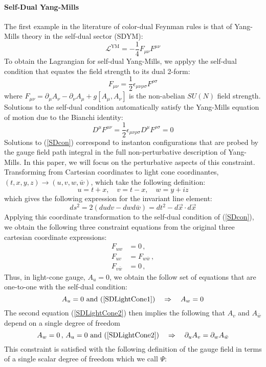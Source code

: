 \documentclass[11pt,letter]{article}
\def\eqn#1{(\ref{#1})}
\def\be{\begin{equation}}
\def\ee{\end{equation}}
\begin{document}
\paragraph{Self-Dual Yang-Mills} The first example in the literature \cite{} of color-dual Feynman rules is that of Yang-Mills theory in the self-dual sector (SDYM):
\be
\mathcal{L}^{\text{YM}} = -\frac{1}{4}F_{\mu\nu}F^{\mu\nu}
\ee
To obtain the Lagrangian for self-dual Yang-Mills, we applyy the self-dual condition that equates the field strength to its dual 2-form:
\be\label{SDcon}
F_{\mu\nu} = \frac{1}{2} \epsilon_{\mu\nu\rho\sigma}F^{\rho\sigma}
\ee
where $F_{\mu\nu} = \partial_\mu A_\nu -\partial_\nu A_\mu + g[A_\mu ,A_\nu]$ is the non-abelian $SU(N)$ field strength. Solutions to the self-dual condition automatically satisfy the Yang-Mills equation of motion due to the Bianchi identity:
\be
D^\mu F^{\mu\nu} = \frac{1}{2} \epsilon_{\mu\nu\rho\sigma}D^\mu F^{\rho\sigma} = 0
\ee
Solutions to \eqn{SDcon} correspond to instanton configurations that are probed by the gauge field path integral in the full non-perturbative description of Yang-Mills. In this paper, we will focus on the perturbative aspects of this constraint. Transforming from Cartesian coordinates to light cone coordinantes, $(t,x,y,z) \rightarrow (u,v,w,\bar{w})$, which take the following definition:
\be
u = t+x,\quad v=t-x, \quad w = y+iz
\ee
which gives the following expression for the invariant line element:
\be
ds^2 = 2(dudv - dwd\bar{w}) = dt^2 - d\vec{x}\cdot d\vec{x}
\ee
Applying this coordinate transformation to the self-dual condition of \eqn{SDcon}, we obtain the following three constraint equations from the original three cartesian coordinate expressions:
\begin{align} \label{SDLightCone1}
F_{uw} &=0\,,
\\
 \label{SDLightCone2}
 F_{uv} &= F_{w\bar{w}}\,,
\\
 \label{SDLightCone3}
 F_{v\bar{w}} &= 0\,,
\end{align}
Thus, in light-cone gauge, $A_u=0$, we obtain the follow set of equations that are one-to-one with the self-dual condition:
\be
A_u=0 \text{ and } \eqn{SDLightCone1} \quad\Rightarrow \quad A_w=0
\ee
The second equation \eqn{SDLightCone2}  then implies the following that $A_v$ and $A_{\bar{w}}$ depend on a single degree of freedom
\be
A_w=0\,,\,A_u=0 \text{ and }\eqn{SDLightCone2} \quad\Rightarrow \quad \partial_u A_v = \partial_w A_{\bar{w}}
\ee
This constraint is  satisfied with the following definition of the gauge field in terms of a single scalar degree of freedom which we call $\Psi$:
\end{document}
